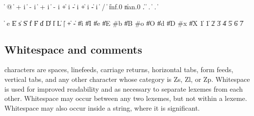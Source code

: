 \begin{grammar}%
 \:  
 \: %
      \|  @ 
   \> \|  +  i %
      \|  -  i
   \> \|  + i %
      \|  - i
   \> \| +  i %
      \| -  i %
      \| + i %
      \| - i
 \:  
 \: %
   \> \|  / 
   \> \|  
   \> \| inf.0 \| nan.0
 \: %
          
   \> \| .  \arbno{\#} 
   \> \|  .  \arbno{\#} 
   \> \|  \atleastone{\#} . \arbno{\#} 
 \:  \arbno{\#}
 \: %
          
   \> \|  
\end{grammar}

\begin{grammar}%
 \:  
   \> \|   
 \: e \| E \| s \| \| S \| f \| F
   \> \| d \| \| D  \| l \| L
 \: 
   \> \| | 
 \:   \| + \|  -
 \: 
   \> \| \#i \| \#I \| \#e \| \#E
 \: \#b \| \#B
 \: \#o \| \#O
 \:  \| \#d \| \#D
 \: \#x \| \#X
  \| 1
  \| 1 \| 2 \| 3 \| 4 \| 5 \| 6 \| 7
 \: 
 \: 
\end{grammar}


\subsection{Whitespace and comments}

 characters are spaces, linefeeds,
carriage returns, horizontal tabs, form feeds, vertical tabs,
and any other character whose category is Zs, Zl, or Zp.
Whitespace is used for improved readability and
as necessary to separate lexemes from each other.  Whitespace may
occur between any two lexemes,
but not within a lexeme.  Whitespace may also occur inside a string,
where it is significant.


